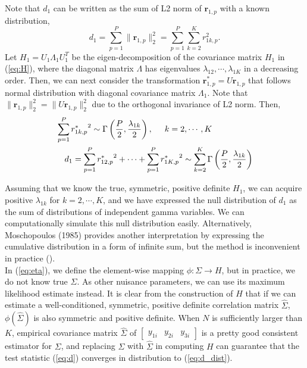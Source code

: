 \documentclass[aap,authoryear, preprint]{imsart}
\numberwithin{equation}{section}
\theoremstyle{plain}
\begin{document}
Note that $d_1$ can be written as the sum of L2 norm of $\bm{r}_{1,p}$ with a known distribution, 
\begin{equation}
d_1 = \sum_{p=1}^{P} \|\bm{r}_{1,p}\|_2^2 = \sum_{p=1}^{P} \sum_{k=2}^K r_{1k,p}^2.
\label{eq:d2}
\end{equation}
Let $H_1 = U_1 \Lambda_1 U_1^T$ be the eigen-decomposition of the covariance matrix $H_1$ in (\ref{eq:H}), where the diagonal matrix $\Lambda$ has eigenvalues $\lambda_{12}, \cdots, \lambda_{1K}$ in a decreasing order. Then, we can next consider the transformation $\bm{r}_{1,p}^* = U\bm{r}_{1,p}$ that follows normal distribution with diagonal covariance matrix $\Lambda_1$. Note that $\|\bm{r}_{1,p}\|_2^2 = \|U\bm{r}_{1,p}\|_2^2$ due to the orthogonal invariance of L2 norm. Then,
\begin{equation}
    \begin{multlined}
    \sum_{p=1}^{P} {r_{1k,p}^*}^2 \sim \Gamma \left( \frac{P}{2}, \frac{\lambda_{1k}}{2} \right), \hspace{5mm} k = 2, \cdots, K\\
    d_1 =  \sum_{p=1}^{P} {r_{12,p}^*}^2 + \cdots +\sum_{p=1}^P{r_{1K,p}^*}^2 \sim \sum_{k=2}^{K} \Gamma \left( \frac{P}{2}, \frac{\lambda_{1k}}{2}\right)
    \end{multlined}
    \label{eq:d_dist}
\end{equation}

Assuming that we know the true, symmetric, positive definite $H_1$, we can acquire positive $\lambda_{1k}$ for $k = 2, \cdots, K$, and we have expressed the null distribution of $d_1$ as the sum of distributions of independent gamma variables. We can computationally simulate this null distribution easily. Alternatively, Moschopoulos (1985) provides another interpretation by expressing the cumulative distribution in a form of infinite sum, but the method is inconvenient in practice (\cite{moschopoulos1985distribution}).\\

In (\ref{eq:eta}), we define the element-wise mapping $\phi: \Sigma \rightarrow H$, but in practice, we do not know true $\Sigma$. As other nuisance parameters, we can use its maximum likelihood estimate instead. It is clear from the construction of $H$ that if we can estimate a well-conditioned, symmetric, positive definite correlation matrix $\hat{\Sigma}$, $\phi(\hat{\Sigma})$ is also symmetric and positive definite. When $N$ is sufficiently larger than $K$, empirical covariance matrix $\hat{\Sigma}$ of $\begin{bmatrix} y_{1i} & y_{2i} & y_{3i} \end{bmatrix}$ is a pretty good consistent estimator for $\Sigma$, and replacing $\Sigma$ with $\hat{\Sigma}$ in computing $H$ can guarantee that the test statistic (\ref{eq:d}) converges in distribution to (\ref{eq:d_dist}). 
\end{document}
